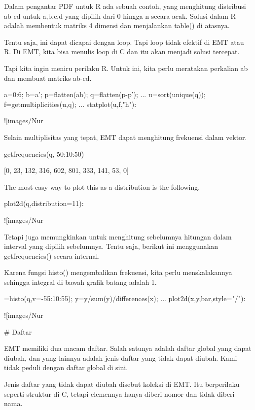 \documentclass{article}
\begin{document}
Dalam pengantar PDF untuk R ada sebuah contoh, yang menghitung
distribusi ab-cd untuk a,b,c,d yang dipilih dari 0 hingga n secara
acak. Solusi dalam R adalah membentuk matriks 4 dimensi dan
menjalankan table() di atasnya.


Tentu saja, ini dapat dicapai dengan loop. Tapi loop tidak efektif di
EMT atau R. Di EMT, kita bisa menulis loop di C dan itu akan menjadi
solusi tercepat.


Tapi kita ingin meniru perilaku R. Untuk ini, kita perlu meratakan
perkalian ab dan membuat matriks ab-cd.


\>a=0:6; b=a'; p=flatten(a\*b); q=flatten(p-p'); ...  
\>   u=sort(unique(q)); f=getmultiplicities(u,q); ...  
\>   statplot(u,f,"h"):


![images/Nur%

Selain multiplisitas yang tepat, EMT dapat menghitung frekuensi dalam
vektor.


\>getfrequencies(q,-50:10:50)


    [0,  23,  132,  316,  602,  801,  333,  141,  53,  0]

The most easy way to plot this as a distribution is the following.


\>plot2d(q,distribution=11):


![images/Nur%

Tetapi juga memungkinkan untuk menghitung sebelumnya hitungan dalam
interval yang dipilih sebelumnya. Tentu saja, berikut ini menggunakan
getfrequencies() secara internal.


Karena fungsi histo() mengembalikan frekuensi, kita perlu
menskalakannya sehingga integral di bawah grafik batang adalah 1.


=histo(q,v=-55:10:55); y=y/sum(y)/differences(x); ...  
\>   plot2d(x,y,\>bar,style="/"):


![images/Nur%

# Daftar

EMT memiliki dua macam daftar. Salah satunya adalah daftar global yang
dapat diubah, dan yang lainnya adalah jenis daftar yang tidak dapat
diubah. Kami tidak peduli dengan daftar global di sini.


Jenis daftar yang tidak dapat diubah disebut koleksi di EMT. Itu
berperilaku seperti struktur di C, tetapi elemennya hanya diberi nomor
dan tidak diberi nama.
\end{document}
